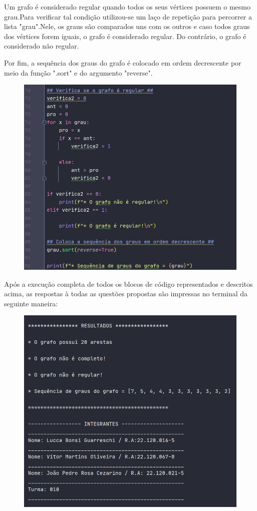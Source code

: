 \documentclass{article}
\begin{document}
	Um grafo é considerado regular quando todos os seus vértices possuem o mesmo grau.Para verificar tal condição utilizou-se um laço de repetição para percorrer a lista "grau".Nele, os graus são comparados uns com os outros e caso todos graus dos vértices forem iguais, o grafo é considerado regular. Do contrário, o grafo é considerado não regular.
	
	Por fim, a sequência dos graus do grafo é colocado em ordem decrescente por meio da função ".sort" e do argumento "reverse".
	
	\begin{figure}[H]
		\centering
		\includegraphics[width=0.5\linewidth]{"Figuras/Print5"}
		\label{fig:print5}
		\caption{}
	\end{figure}\vspace*{0.3cm}
	\newpage
	Após a execução completa de todos os blocos de código representados e descritos acima, as respostas à todas as questões propostas são impressas no terminal da seguinte maneira:
	
	\begin{figure}[H]
		\centering
		\includegraphics[width=0.5\linewidth]{"Figuras/Print6"}
		\label{fig:print6}
		\caption{}
	\end{figure}\vspace*{0.3cm}
	
	
\end{document}
